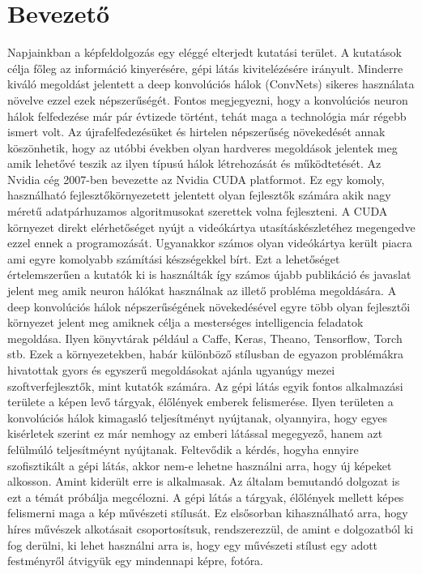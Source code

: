 \documentclass[12pt, a4paper, oneside]{book}
\theoremstyle{tetel}
\newcommand\capterro[1]{%
  \addcontentsline{tce}{chapter}{\protect\makebox[1.3em][l]{\thechapter.}#1}}
\newcommand\capteren[1]{%
  \addcontentsline{tcen}{chapter}{\protect\makebox[1.3em][l]{\thechapter.}#1}}
\begin{document}
\newpage
\tableofcontents
\newpage
\listofindice
\newpage
\listofindiceen


\chapter{Bevezető}
\capterro{Întroducere}
\capteren{Indroduction}

Napjainkban a képfeldolgozás egy eléggé elterjedt kutatási terület. A kutatások célja főleg az információ kinyerésére, gépi látás kivitelézésére irányult. Minderre kiváló megoldást jelentett a deep konvolúciós hálok (ConvNets)\cite{1}\cite{2} sikeres használata növelve ezzel ezek népszerűségét. Fontos megjegyezni, hogy a konvolúciós neuron hálok felfedezése már pár évtizede történt, tehát maga a technológia már régebb ismert volt. Az újrafelfedezésüket és hirtelen népszerűség növekedését annak köszönhetik, hogy az utóbbi években olyan hardveres megoldások jelentek meg amik lehetővé teszik az ilyen típusú hálok létrehozását és működtetését. 
\newline 
\indent
Az Nvidia cég 2007-ben bevezette az Nvidia CUDA platformot\cite{3}. Ez egy komoly, használható fejlesztőkörnyezetett jelentett olyan fejlesztők számára akik nagy méretű adatpárhuzamos algoritmusokat szerettek volna fejleszteni. A CUDA környezet direkt elérhetőséget nyújt a videókártya utasításkészletéhez megengedve ezzel ennek a programozását. Ugyanakkor számos olyan videókártya került piacra ami egyre komolyabb számítási készségekkel bírt. Ezt a lehetőséget értelemszerűen a kutatók ki is használták így számos újabb publikáció és javaslat jelent meg amik neuron hálókat használnak az illető probléma megoldására.
\newline
\indent
A deep konvolúciós hálok népszerűségének növekedésével egyre több olyan fejlesztői környezet jelent meg amiknek célja a mesterséges intelligencia feladatok megoldása. Ilyen könyvtárak például a Caffe\cite{4}, Keras\cite{5}, Theano\cite{6}, Tensorflow\cite{7}, Torch\cite{8} stb. Ezek a környezetekben, habár különböző stílusban de egyazon problémákra hivatottak gyors és egyszerű megoldásokat ajánla ugyanúgy mezei szoftverfejlesztők, mint kutatók számára.
\newline
\indent
Az gépi látás egyik fontos alkalmazási területe a képen levő tárgyak, élőlények emberek felismerése. Ilyen területen a konvolúciós hálok kimagasló teljesítményt nyújtanak, olyannyira, hogy egyes kisérletek szerint ez már nemhogy az emberi látással megegyező, hanem azt felülmúló teljesítméynt nyújtanak\cite{9}. Feltevődik a kérdés, hogyha ennyire szofisztikált a gépi látás, akkor nem-e lehetne használni arra, hogy új képeket alkosson. Amint kiderült erre is alkalmasak. Az általam bemutandó dolgozat is ezt a témát próbálja megcélozni. A gépi látás a tárgyak, élőlények mellett képes felismerni maga a kép művészeti stílusát. Ez elsősorban kihasználható arra, hogy híres művészek alkotásait csoportosítsuk, rendszerezzül\cite{10}, de amint e dolgozatból ki fog derülni, ki lehet használni arra is, hogy egy művészeti stílust egy adott festményről átvigyük egy mindennapi képre, fotóra. 
\end{document}
